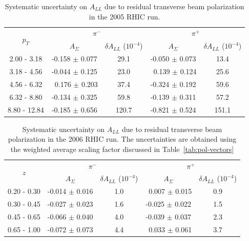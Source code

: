 \begin{table}
  \centering
  \begin{tabular}{|c||c|c||c|c|}
    \hline
    \multirow{2}{*}{$p_T$} & \multicolumn{2}{c||}{$\pi^{-}$} & \multicolumn{2}{c|}{$\pi^{+}$} \\
    \cline{2-5}
    & $A_{\Sigma}$ & $\delta A_{LL}$ ($10^{-4}$) & $A_{\Sigma}$ & $\delta A_{LL}$ ($10^{-4}$) \\
    \hline
    2.00 - 3.18  & -0.158 $\pm$ 0.077 & 29.1  & -0.050 $\pm$ 0.073 & 13.4  \\
    3.18 - 4.56  & -0.044 $\pm$ 0.125 & 23.0  & ~0.139 $\pm$ 0.124 & 25.6  \\
    4.56 - 6.32  & ~0.176 $\pm$ 0.203 & 37.4  & -0.324 $\pm$ 0.192 & 59.6  \\
    6.32 - 8.80  & -0.134 $\pm$ 0.325 & 59.8  & -0.139 $\pm$ 0.311 & 57.2  \\
    8.80 - 12.84 & -0.185 $\pm$ 0.656 & 120.7 & -0.821 $\pm$ 0.524 & 151.1 \\
    \hline
  \end{tabular}
  \caption{Systematic uncertainty on $A_{LL}$ due to residual transverse beam polarization in the 2005 RHIC run.}
  \label{tab:syst-pol-2005}
\end{table}

\begin{table}
  \centering
  \begin{tabular}{|c||c|c||c|c|}
    \hline
    \multirow{2}{*}{$z$} & \multicolumn{2}{c||}{$\pi^{-}$} & \multicolumn{2}{c|}{$\pi^{+}$} \\
    \cline{2-5}
    & $A_{\Sigma}$ & $\delta A_{LL}$ ($10^{-4}$) & $A_{\Sigma}$ & $\delta A_{LL}$ ($10^{-4}$) \\
    \hline
    0.20 - 0.30 & -0.014 $\pm$ 0.016 & 1.0 & ~0.007 $\pm$ 0.015 & 0.9 \\
    0.30 - 0.45 & -0.027 $\pm$ 0.023 & 1.6 & -0.025 $\pm$ 0.022 & 1.5 \\
    0.45 - 0.65 & -0.066 $\pm$ 0.040 & 4.0 & -0.039 $\pm$ 0.037 & 2.3 \\
    0.65 - 1.00 & -0.072 $\pm$ 0.073 & 4.4 & ~0.033 $\pm$ 0.061 & 3.7 \\
    \hline
  \end{tabular}
  \caption{Systematic uncertainty on $A_{LL}$ due to residual transverse beam polarization in the 2006 RHIC run.  The uncertainties are obtained using the weighted average scaling factor discussed in Table~\ref{tab:pol-vectors}}
  \label{tab:syst-pol-2006}
\end{table}

